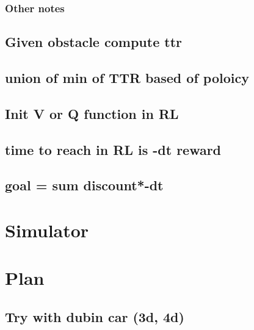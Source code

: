 \documentclass[11pt]{article}
\begin{document}
\subsubsection{Other notes}
\label{sec:org44f1722}


\subsection{Given obstacle compute ttr}
\label{sec:orgdfceaa3}
\subsection{union of min of TTR based of poloicy}
\label{sec:orge2894dd}
\subsection{Init V or Q function in RL}
\label{sec:orgf41e5a3}
\subsection{time to reach in RL is -dt reward}
\label{sec:org1462e21}
\subsection{goal = sum discount*-dt}
\label{sec:org94f8b2d}
\section{Simulator}
\label{sec:org6f610a2}
\section{Plan}
\label{sec:orgf2d26c6}
\subsection{Try with dubin car (3d, 4d)}
\label{sec:org0505fb0}
\end{document}
